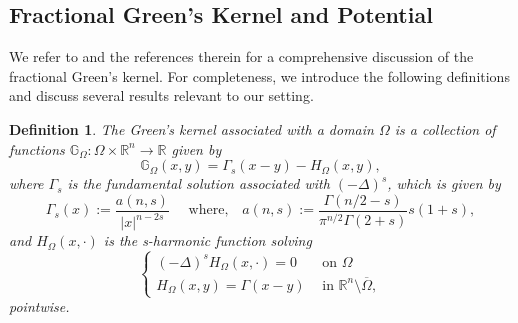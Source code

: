 \documentclass{amsart}
\newtheorem{definition}[theorem]{Definition}
\newcommand{\R}{\mathbb{R}}
\newcommand{\slap}{(-\Delta)^{s}}
\newcommand{\rn}{\mathbb{R}^{n}}
\newcommand{\gk}[1]{\mathbb{G}_{#1}}
\begin{document}
\subsection{Fractional Green's Kernel and Potential}  
We refer to \cite{Lankoff1972} and the references therein for a comprehensive discussion of the fractional Green's kernel. For completeness, we introduce the following definitions and discuss several results relevant to our setting.
\begin{definition}
   The Green's kernel associated with a domain $\Omega$ is a collection of functions $\gk{\Omega}:\Omega\times\rn \to\R$ given by 
    \begin{equation*}
        \gk{\Omega}(x,y)=\Gamma_{s}(x-y)-H_{\Omega}(x,y),
    \end{equation*}
    where $\Gamma_{s}$ is the fundamental solution associated with $\slap$, which is given by 
    \begin{equation*}
        \Gamma_{s}(x):= \frac{ a(n,s)  }{|x|^{n-2s}}\quad \text{ where,}\quad a(n,s):=\frac{\Gamma(n/2-s)}{\pi^{n/2}\Gamma(2+s)}s(1+s),
    \end{equation*}
    and $H_{\Omega}(x,\cdot)$ is the s-harmonic function solving
    \begin{equation*}\label{dfn of H}
        \begin{cases}
            \slap H_{\Omega}(x,\cdot)=0 \quad &\text{on }\Omega\\
            H_{\Omega}(x,y)=\Gamma(x-y) &\text{in } \R^{n}\setminus\overline{\Omega},
        \end{cases}
    \end{equation*}
    pointwise.
\end{definition}
\end{document}
